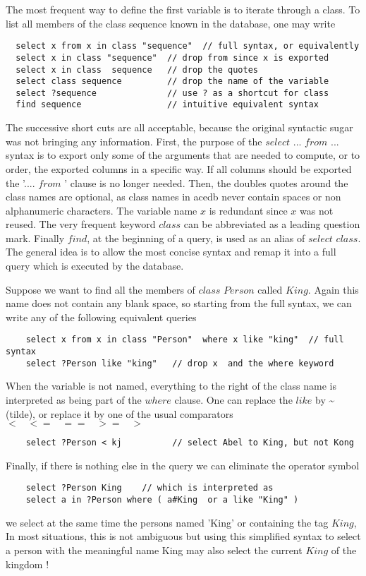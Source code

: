 \documentclass[11pt]{article}
\newcommand{\BL}{\begin{lstlisting}}
\begin{document}
 The most frequent way to define the first variable is to iterate through a class. To list
all members of the class sequence known in the database, one may write
\BL
  select x from x in class "sequence"  // full syntax, or equivalently
  select x in class "sequence"  // drop from since x is exported
  select x in class  sequence   // drop the quotes
  select class sequence         // drop the name of the variable
  select ?sequence              // use ? as a shortcut for class
  find sequence                 // intuitive equivalent syntax
\end{lstlisting}
The successive short cuts are all acceptable, because the original syntactic sugar
was not bringing any information. First, 
the purpose of the $select$ ... $from$ ... syntax is to export only some of the arguments that are needed to compute,
 or to order, the exported columns in a specific way. If all columns should be exported the '.... $from$ ' clause 
is no longer needed. Then, the doubles quotes around the class names 
are optional, as class names in acedb never contain spaces or non alphanumeric characters. 
The variable name $x$ is redundant since $x$ was not reused. The very frequent keyword $class$
can be abbreviated as a leading question mark. Finally $find$, at the beginning of a query,
is used as an alias of $select$ $class$. The general idea is to allow the most concise syntax
and remap it into a full query which is executed by the database.

Suppose we want to find all the members of $class$ $Person$ called $King$. Again this name does not
contain any blank space, so starting from the full syntax, we can write any of the following 
equivalent queries
\BL
    select x from x in class "Person"  where x like "king"  // full syntax
    select ?Person like "king"   // drop x  and the where keyword
\end{lstlisting}

When the variable is not named, everything to the right of the class name is interpreted
as being part of the $where$ clause. 
One can replace the $like$ by \~{}  (tilde), or replace it by
one of the usual comparators $< \;\;\; <= \;\;\; == \;\;\; >= \;\;\; >$

\BL
    select ?Person < kj          // select Abel to King, but not Kong
\end{lstlisting}

Finally, if there is nothing else in the query we can eliminate the operator symbol
\BL
    select ?Person King    // which is interpreted as 
    select a in ?Person where ( a#King  or a like "King" )
\end{lstlisting}
we select at the same time the persons named 'King' or containing the tag $King$,
In most situations, this is not ambiguous but using this simplified syntax to select a person
with the meaningful name King may also select the current $King$ of the kingdom !
\end{document}
